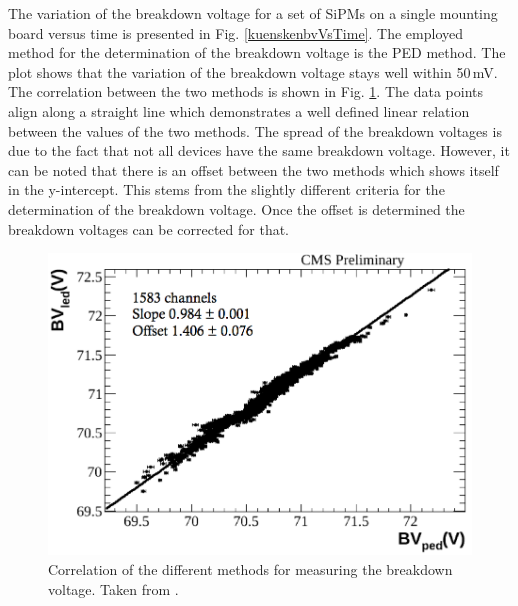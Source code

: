 The variation of the breakdown voltage for a set of SiPMs on a single mounting board versus time is presented in Fig. \ref{kuenskenbvVsTime}. The employed method for the determination of the breakdown voltage is the PED method. The plot shows that the variation of the breakdown voltage stays well within 50\,mV. The correlation between the two methods is shown in Fig. \ref{kuenskenbvCorr}. The data points align along a straight line which demonstrates a well defined linear relation between the values of the two methods. The spread of the breakdown voltages is due to the fact that not all devices have the same breakdown voltage. However, it can be noted that there is an offset between the two methods which shows itself in the y-intercept. This stems from the slightly different criteria for the determination of the breakdown voltage. Once the offset is determined the breakdown voltages can be corrected for that.
\begin{figure}
\centering
\begin{minipage}[b]{0.475\textwidth}
\includegraphics[width=\textwidth]{Figures/kuensken/bvCorrelation.png}
\end{minipage}
\hspace{0.5cm}
\begin{minipage}[b]{0.475\textwidth}
\caption{Correlation of the different methods for measuring the breakdown voltage. Taken from \cite{kuenskenCalor}.}
\label{kuenskenbvCorr}
\end{minipage}
\end{figure}
